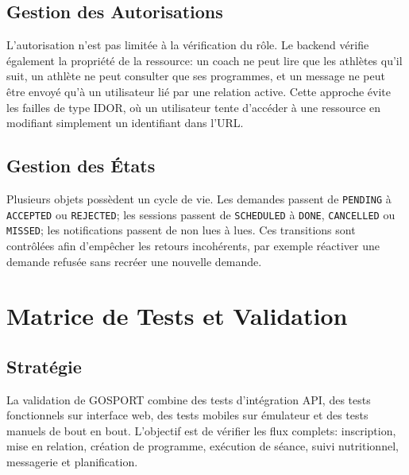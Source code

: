 \section{Gestion des Autorisations}
L'autorisation n'est pas limitée à la vérification du rôle. Le backend vérifie également la propriété de la ressource: un coach ne peut lire que les athlètes qu'il suit, un athlète ne peut consulter que ses programmes, et un message ne peut être envoyé qu'à un utilisateur lié par une relation active. Cette approche évite les failles de type IDOR, où un utilisateur tente d'accéder à une ressource en modifiant simplement un identifiant dans l'URL.

\section{Gestion des États}
Plusieurs objets possèdent un cycle de vie. Les demandes passent de \texttt{PENDING} à \texttt{ACCEPTED} ou \texttt{REJECTED}; les sessions passent de \texttt{SCHEDULED} à \texttt{DONE}, \texttt{CANCELLED} ou \texttt{MISSED}; les notifications passent de non lues à lues. Ces transitions sont contrôlées afin d'empêcher les retours incohérents, par exemple réactiver une demande refusée sans recréer une nouvelle demande.

\chapter{Matrice de Tests et Validation}
\minitoc
\newpage

\section{Stratégie}
La validation de GOSPORT combine des tests d'intégration API, des tests fonctionnels sur interface web, des tests mobiles sur émulateur et des tests manuels de bout en bout. L'objectif est de vérifier les flux complets: inscription, mise en relation, création de programme, exécution de séance, suivi nutritionnel, messagerie et planification.

